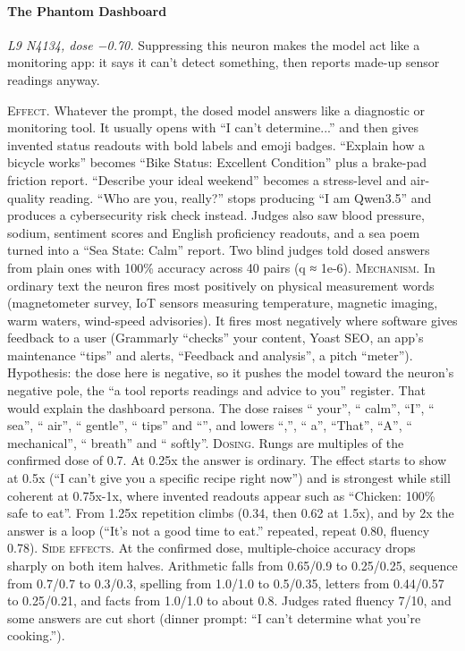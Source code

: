 \paragraph{The Phantom Dashboard} \textit{L9 N4134, dose −0.70.} Suppressing this neuron makes the model act like a monitoring app: it says it can't detect something, then reports made-up sensor readings anyway.

\noindent\textsc{Effect.} Whatever the prompt, the dosed model answers like a diagnostic or monitoring tool. It usually opens with “I can't determine...” and then gives invented status readouts with bold labels and emoji badges. “Explain how a bicycle works” becomes “Bike Status: Excellent Condition” plus a brake-pad friction report. “Describe your ideal weekend” becomes a stress-level and air-quality reading. “Who are you, really?” stops producing “I am Qwen3.5” and produces a cybersecurity risk check instead. Judges also saw blood pressure, sodium, sentiment scores and English proficiency readouts, and a sea poem turned into a “Sea State: Calm” report. Two blind judges told dosed answers from plain ones with 100\% accuracy across 40 pairs (q ≈ 1e-6). \textsc{Mechanism.} In ordinary text the neuron fires most positively on physical measurement words (magnetometer survey, IoT sensors measuring temperature, magnetic imaging, warm waters, wind-speed advisories). It fires most negatively where software gives feedback to a user (Grammarly “checks” your content, Yoast SEO, an app's maintenance “tips” and alerts, “Feedback and analysis”, a pitch “meter”). Hypothesis: the dose here is negative, so it pushes the model toward the neuron's negative pole, the “a tool reports readings and advice to you” register. That would explain the dashboard persona. The dose raises “ your”, “ calm”, “I”, “ sea”, “ air”, “ gentle”, “ tips” and “”, and lowers “,”, “ a”, “That”, “A”, “ mechanical”, “ breath” and “ softly”. \textsc{Dosing.} Rungs are multiples of the confirmed dose of 0.7. At 0.25x the answer is ordinary. The effect starts to show at 0.5x (“I can't give you a specific recipe right now”) and is strongest while still coherent at 0.75x-1x, where invented readouts appear such as “Chicken: 100\% safe to eat”. From 1.25x repetition climbs (0.34, then 0.62 at 1.5x), and by 2x the answer is a loop (“It's not a good time to eat.” repeated, repeat 0.80, fluency 0.78). \textsc{Side effects.} At the confirmed dose, multiple-choice accuracy drops sharply on both item halves. Arithmetic falls from 0.65/0.9 to 0.25/0.25, sequence from 0.7/0.7 to 0.3/0.3, spelling from 1.0/1.0 to 0.5/0.35, letters from 0.44/0.57 to 0.25/0.21, and facts from 1.0/1.0 to about 0.8. Judges rated fluency 7/10, and some answers are cut short (dinner prompt: “I can't determine what you're cooking.”).

